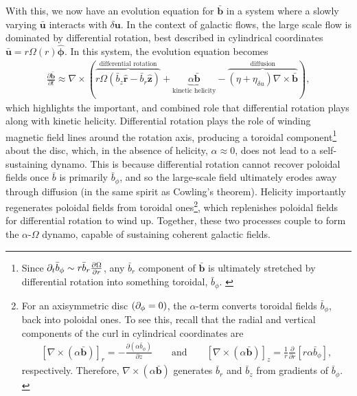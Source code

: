 \documentclass[12pt,twoside]{extreport}
\newcommand{\rbrac}[1]{\left( #1 \right)} %
\newcommand{\sbrac}[1]{\left[ #1 \right]} %
\newcommand{\mCurl}[1]{\nabla \times #1} %
\newcommand{\mUnit}[1]{\widehat{#1}}
\newcommand{\mVector}[1]{\bm{#1}} %
\newcommand{\mVectorUnit}[1]{\mUnit{\mVector{#1}}} %
\newcommand{\mpp}[1]{\partial #1}
\newcommand{\mppFrac}[2]{\frac{\mpp{#1}}{\mpp{#2}}}
\begin{document}
With this, we now have an evolution equation for $\bar{\mVector{b}}$ in a system where a slowly varying $\bar{\mVector{u}}$ interacts with $\delta\mVector{u}$. In the context of galactic flows, the large scale flow is dominated by differential rotation, best described in cylindrical coordinates $\bar{\mVector{u}} = r \Omega(r) \hat{\mVector{\phi}}$. In this system, the evolution equation becomes
\begin{align}
    \mppFrac{\bar{\mVector{b}}}{t}
        \approx \mCurl{\rbrac{
            \overbrace{
                r \Omega \rbrac{
                    \bar{b}_z \mVectorUnit{r}
                    - \bar{b}_r \mVectorUnit{z}
                }
            }^\text{differential rotation}
            + \underbrace{
                \alpha \bar{\mVector{b}}
            }_\text{kinetic helicity}
            - \overbrace{
                (\eta + \eta_{\delta u}) \mCurl{\bar{\mVector{b}}}
            }^\text{diffusion}
        }}
    ,
\end{align}
which highlights the important, and combined role that differential rotation plays along with kinetic helicity. Differential rotation plays the role of winding magnetic field lines around the rotation axis, producing a toroidal component\footnote{
    Since $\mpp_t \bar{b}_\phi \sim r \bar{b}_r \mppFrac{\Omega}{r}$, any $\bar{b}_r$ component of $\bar{\mVector{b}}$ is ultimately stretched by differential rotation into something toroidal, $\bar{b}_\phi$.
    \label{fnote:lsd:omega}
} about the disc, which, in the absence of helicity, $\alpha \approx 0$, does not lead to a self-sustaining dynamo. This is because differential rotation cannot recover poloidal fields once $\bar{b}$ is primarily $\bar{b}_\phi$, and so the large-scale field ultimately erodes away through diffusion (in the same spirit as Cowling's theorem). Helicity importantly regenerates poloidal fields from toroidal ones\footnote{
    For an axisymmetric disc $(\mpp_\phi = 0)$, the $\alpha$-term converts toroidal fields $\bar{b}_\phi$, back into poloidal ones. To see this, recall that the radial and vertical components of the curl in cylindrical coordinates are
    \begin{align}
    \sbrac{\mCurl{(\alpha\bar{\mVector{b}})}}_r
        = -\mppFrac{(\alpha \bar{b}_\phi)}{z}
    \qquad\mbox{and}\qquad
    \sbrac{\mCurl{(\alpha\bar{\mVector{b}})}}_z
        = \frac{1}{r}\mppFrac{}{r}\sbrac{r \alpha\bar{b}_\phi}
    ,
    \end{align}
    respectively. Therefore, $\mCurl{(\alpha\bar{\mVector{b}})}$ generates $\bar{b}_r$ and $\bar{b}_z$ from gradients of $\bar{b}_\phi$.
    \label{fnote:lsd:alpha}
}, which replenishes poloidal fields for differential rotation to wind up. Together, these two processes couple to form the $\alpha$-$\Omega$ dynamo, capable of sustaining coherent galactic fields.
\end{document}
